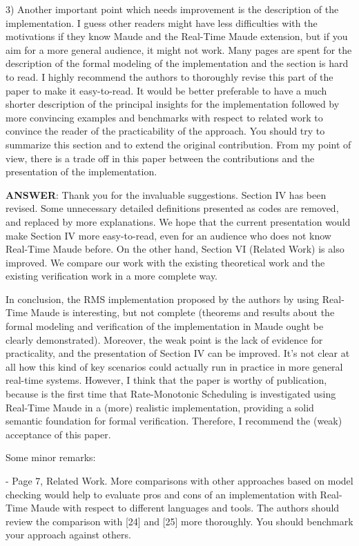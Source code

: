 \documentclass[10pt,journal]{IEEEtran}
\newcommand{\ANSWER}{{\bf ANSWER}}
\begin{document}
3) Another important point which needs improvement is the description
of the implementation. I guess other readers might have less
difficulties with the motivations if they know Maude and the Real-Time
Maude extension, but if you aim for a more general audience, it might
not work. Many pages are spent for the description of the formal
modeling of the implementation and the section is hard to read. I
highly recommend the authors to thoroughly revise this part of the
paper to make it easy-to-read. It would be better preferable to have a
much shorter description of the principal insights for the
implementation followed by more convincing examples and benchmarks
with respect to related work to convince the reader of the
practicability of the approach. You should try to summarize this
section and to extend the original contribution. From my point of
view, there is a trade off in this paper between the contributions and
the presentation of the implementation.

\ANSWER: Thank you for the invaluable suggestions. Section IV has been
revised. Some unnecessary detailed definitions presented as codes are
removed, and replaced by more explanations. We hope that the current
presentation would make Section IV more easy-to-read, even for an
audience who does not know Real-Time Maude before. On the other hand,
Section VI (Related Work) is also improved. We compare our work with
the existing theoretical work and the existing verification work in a
more complete way.

In conclusion, the RMS implementation proposed by the authors by using
Real-Time Maude is interesting, but not complete (theorems and results
about the formal modeling and verification of the implementation in
Maude ought be clearly demonstrated). Moreover, the weak point is the
lack of evidence for practicality, and the presentation of Section IV
can be improved. It's not clear at all how this kind of key scenarios
could actually run in practice in more general real-time
systems. However, I think that the paper is worthy of publication,
because is the first time that Rate-Monotonic Scheduling is
investigated using Real-Time Maude in a (more) realistic
implementation, providing a solid semantic foundation for formal
verification. Therefore, I recommend the (weak) acceptance of this
paper.

Some minor remarks:

- Page 7, Related Work. More comparisons with other approaches based
on model checking would help to evaluate pros and cons of an
implementation with Real-Time Maude with respect to different
languages and tools. The authors should review the comparison with
[24] and [25] more thoroughly. You should benchmark your approach
against others.
\end{document}
